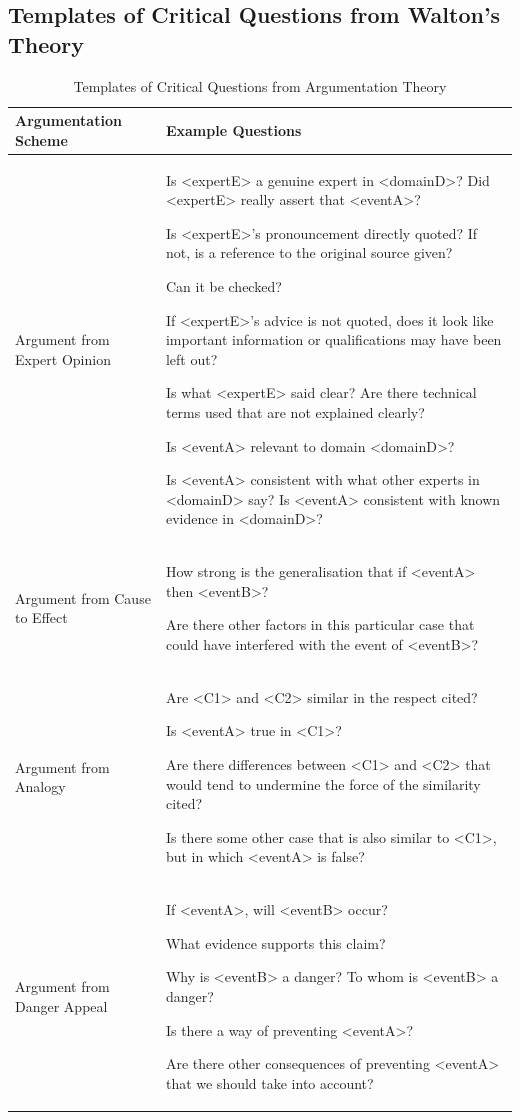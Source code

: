 \documentclass[11pt]{article}
\begin{document}
\subsection{Templates of Critical Questions from Walton's Theory}
\begin{table} [H]
\centering
\begin{tabular}{p{4cm}p{12cm}}
\hline
\textbf{Argumentation Scheme} & \textbf{Example Questions} \\
\hline
Argument from Expert Opinion & Is <expertE> a genuine expert in <domainD>? Did <expertE> really assert that <eventA>? 

Is <expertE>'s pronouncement directly quoted? If not, is a reference to the original source given? 

Can it be checked? 

If <expertE>'s advice is not quoted, does it look like important information or qualifications may have been left out? 

Is what <expertE> said clear? Are there technical terms used that are not explained clearly? 

Is <eventA> relevant to domain <domainD>? 

Is <eventA> consistent with what other experts in <domainD> say? Is <eventA> consistent with known evidence in <domainD>? \\
\hline
Argument from Cause to Effect & How strong is the generalisation that if <eventA> then <eventB>? 

Are there other factors in this particular case that could have interfered with the event of <eventB>? \\
\hline
Argument from Analogy & Are <C1> and <C2> similar in the respect cited?

Is <eventA> true in <C1>? 

Are there differences between <C1> and <C2> that would tend to undermine the force of the similarity cited? 

Is there some other case that is also similar to <C1>, but in which <eventA> is false? \\
\hline
Argument from Danger Appeal & If <eventA>, will <eventB> occur?

What evidence supports this claim?

Why is <eventB> a danger? To whom is <eventB> a danger?

Is there a way of preventing <eventA>?

Are there other consequences of preventing <eventA> that we should take into account? \\
\hline
\end{tabular}
\caption{Templates of Critical Questions from Argumentation Theory}
\label{tab:argumentation_questions}
\end{table}
\end{document}

